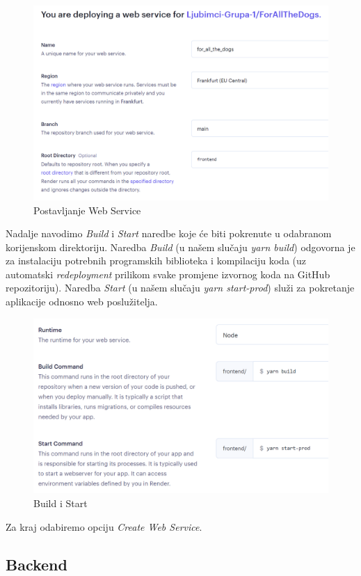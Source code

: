 			\begin{figure}[H]
				\includegraphics[scale=0.6]{slike/frontend_1.PNG} 
				\centering
				\caption{Postavljanje Web Service}
				\label{frontend_1}
			\end{figure}
			
			Nadalje navodimo \textit{Build} i \textit{Start} naredbe koje će biti pokrenute u odabranom korijenskom direktoriju. Naredba \textit{Build} (u našem slučaju \textit{yarn build}) odgovorna je za instalaciju potrebnih programskih biblioteka i kompilaciju koda (uz automatski \textit{redeployment} prilikom svake promjene izvornog koda na GitHub repozitoriju). Naredba \textit{Start} (u našem slučaju \textit{yarn start-prod}) služi za pokretanje aplikacije odnosno web poslužitelja.
			
			\begin{figure}[H]
				\includegraphics[scale=0.6]{slike/frontend_2.PNG} 
				\centering
				\caption{Build i Start}
				\label{frontend_2}
			\end{figure}
			
			Za kraj odabiremo opciju \textit{Create Web Service}.
			
			\subsection{Backend}
			
			\eject 